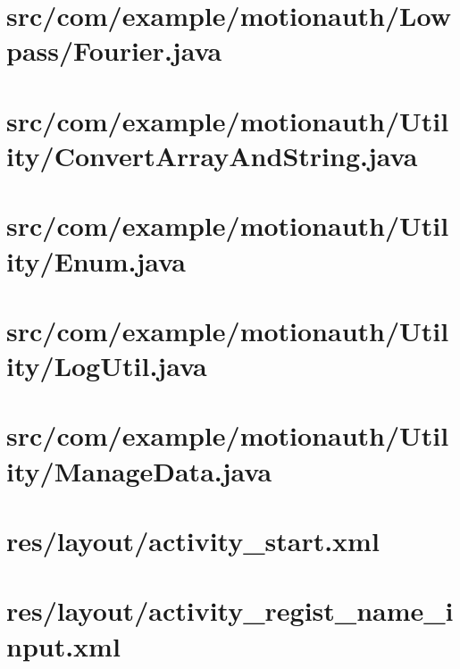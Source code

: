\documentclass[11pt]{jreport}
\renewcommand{\slash}{/}
\begin{document}
    \section{src\slash com\slash example\slash motionauth\slash Lowpass\slash Fourier.java}
    

    \section{src\slash com\slash example\slash motionauth\slash Utility\slash ConvertArrayAndString.java}
    

    \section{src\slash com\slash example\slash motionauth\slash Utility\slash Enum.java}
    

    \section{src\slash com\slash example\slash motionauth\slash Utility\slash LogUtil.java}
    

    \section{src\slash com\slash example\slash motionauth\slash Utility\slash ManageData.java}
    
    
    \section{res\slash layout\slash activity\_start.xml}
    

    \section{res\slash layout\slash activity\_regist\_name\_input.xml}
    
\end{document}

